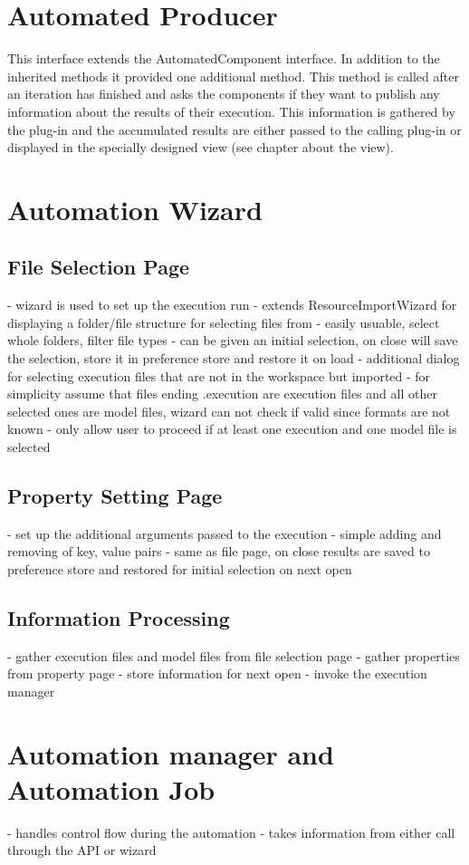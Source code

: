 \section{Automated Producer}
This interface extends the AutomatedComponent interface.
In addition to the inherited methods it provided one additional method.
This method is called after an iteration has finished and asks the components
if they want to publish any information about the results of their execution.
This information is gathered by the plug-in and the accumulated results
are either passed to the calling plug-in or displayed in the
specially designed view (see chapter about the view).

\section{Automation Wizard}
\subsection{File Selection Page}
- wizard is used to set up the execution run
- extends ResourceImportWizard for displaying a folder/file structure for selecting files from
- easily usuable, select whole folders, filter file types
- can be given an initial selection, on close will save the selection, store it in preference store
and restore it on load
- additional dialog for selecting execution files that are not in the workspace but imported
- for simplicity assume that files ending .execution are execution files and all other selected
ones are model files, wizard can not check if valid since formats are not known
- only allow user to proceed if at least one execution and one model file is selected
\subsection{Property Setting Page}
- set up the additional arguments passed to the execution
- simple adding and removing of key, value pairs
- same as file page, on close results are saved to preference store and restored for initial
selection on next open
\subsection{Information Processing}
- gather execution files and model files from file selection page
- gather properties from property page
- store information for next open
- invoke the execution manager

\section{Automation manager and Automation Job}
- handles control flow during the automation
- takes information from either call through the API or wizard

